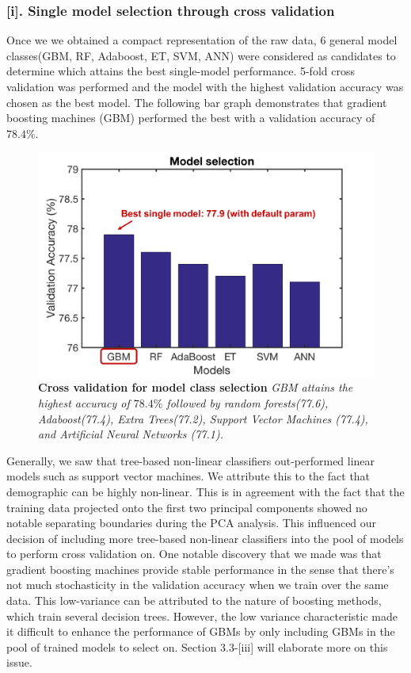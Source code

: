 \subsubsection*{[i]. Single model selection through cross validation}
Once we we obtained a compact representation of the raw data, 6 general model classes(GBM, RF, Adaboost, ET, SVM, ANN) were considered as candidates to determine which attains the best single-model performance. 5-fold cross validation was performed and the model with the highest validation accuracy was chosen as the best model. The following bar graph demonstrates that gradient boosting machines (GBM) performed the best with a validation accuracy of $78.4\%$.
\begin{figure}[h]
\center
\includegraphics[scale=0.45]{figure2/figure2.png}
\caption{\textbf{Cross validation for model class selection} \textit{GBM attains the highest accuracy of $78.4\%$ followed by random forests(77.6), Adaboost(77.4), Extra Trees(77.2), Support Vector Machines (77.4), and Artificial Neural Networks (77.1).}}
\end{figure}

Generally, we saw that tree-based non-linear classifiers out-performed linear models such as support vector machines. We attribute this to the fact that demographic can be highly non-linear. This is in agreement with the fact that the training data projected onto the first two principal components showed no notable separating boundaries during the PCA analysis. This influenced our decision of including more tree-based non-linear classifiers into the pool of models to perform cross validation on. One notable discovery that we made was that gradient boosting machines provide stable performance in the sense that there's not much stochasticity in the validation accuracy when we train over the same data. This low-variance can be attributed to the nature of boosting methods, which train several decision trees. However, the low variance characteristic made it difficult to enhance the performance of GBMs by only including GBMs in the pool of trained models to select on. Section 3.3-[iii] will elaborate more on this issue.

